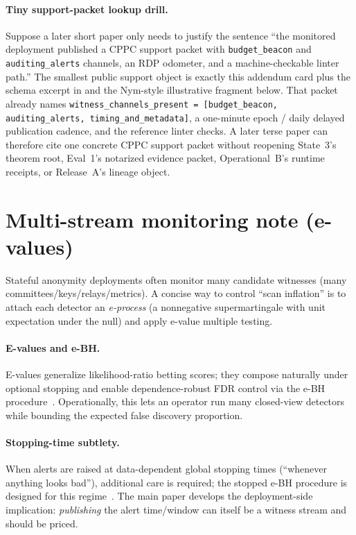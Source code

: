 \documentclass[11pt]{article}
\theoremstyle{definition}
\theoremstyle{remark}
\begin{document}
\paragraph{Tiny support-packet lookup drill.}
Suppose a later short paper only needs to justify the sentence ``the monitored deployment published a CPPC support packet with \texttt{budget\_beacon} and \texttt{auditing\_alerts} channels, an RDP odometer, and a machine-checkable linter path.''
The smallest public support object is exactly this addendum card plus the schema excerpt in  and the Nym-style illustrative fragment below.
That packet already names \texttt{witness\_channels\_present = [budget\_beacon, auditing\_alerts, timing\_and\_metadata]}, a one-minute epoch / daily delayed publication cadence, and the reference linter checks.
A later terse paper can therefore cite one concrete CPPC support packet without reopening State~3's theorem root, Eval~1's notarized evidence packet, Operational~B's runtime receipts, or Release~A's lineage object.

\appendix


\section{Multi-stream monitoring note (e-values)}
\label{app:multi}
Stateful anonymity deployments often monitor many candidate witnesses (many committees/keys/relays/metrics).
A concise way to control ``scan inflation'' is to attach each detector an \emph{e-process} (a nonnegative supermartingale with unit expectation under the null) and apply e-value multiple testing.

\paragraph{E-values and e-BH.}
E-values generalize likelihood-ratio betting scores; they compose naturally under optional stopping and enable dependence-robust FDR control via the e-BH procedure~\cite{ramdas2024evalues,wang2022ebh}.
Operationally, this lets an operator run many closed-view detectors while bounding the expected false discovery proportion.

\paragraph{Stopping-time subtlety.}
When alerts are raised at data-dependent global stopping times (``whenever anything looks bad''), additional care is required; the stopped e-BH procedure is designed for this regime~\cite{wang2025sebH}.
The main paper develops the deployment-side implication: \emph{publishing} the alert time/window can itself be a witness stream and should be priced.\cite{series:state3}
\end{document}
